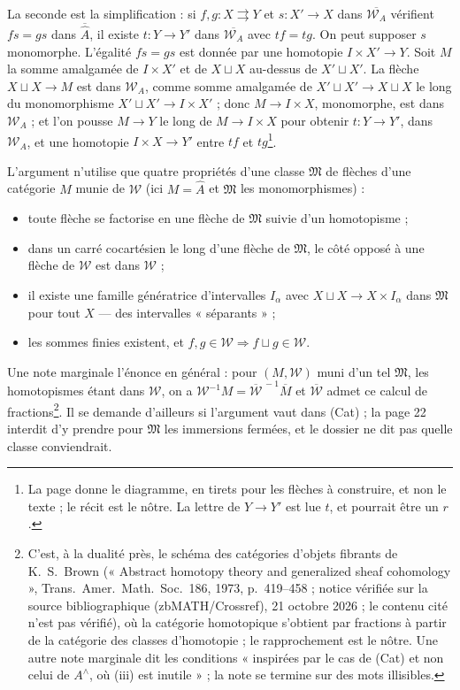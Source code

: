 \documentclass[11pt,a4paper]{article}
\begin{document}
La seconde est la simplification : si $f, g : X \rightrightarrows Y$ et
$s : X' \to X$ dans $\overline{\mathcal{W}_{A}}$ vérifient $fs = gs$ dans
$\overline{\widehat{A}}$, il existe $t : Y \to Y'$ dans
$\overline{\mathcal{W}_{A}}$ avec $tf = tg$. On peut supposer $s$ monomorphe.
L'égalité $fs = gs$ est donnée par une homotopie $I \times X' \to Y$. Soit
$M$ la somme amalgamée de $I \times X'$ et de $X \sqcup X$ au-dessus de
$X' \sqcup X'$. La flèche $X \sqcup X \to M$ est dans $\mathcal{W}_{A}$, comme
somme amalgamée de $X' \sqcup X' \to X \sqcup X$ le long du monomorphisme
$X' \sqcup X' \to I \times X'$ ; donc $M \to I \times X$, monomorphe, est dans
$\mathcal{W}_{A}$ ; et l'on pousse $M \to Y$ le long de $M \to I \times X$ pour
obtenir $t : Y \to Y'$, dans $\mathcal{W}_{A}$, et une homotopie
$I \times X \to Y'$ entre $tf$ et $tg$\footnote{La page donne le diagramme, en
tirets pour les flèches à construire, et non le texte ; le récit est le
nôtre. La lettre de $Y \to Y'$ est lue $t$, et pourrait être un $r$.}.

L'argument n'utilise que quatre propriétés d'une classe $\mathfrak{M}$ de
flèches d'une catégorie $M$ munie de $\mathcal{W}$ (ici
$M = \widehat{A}$ et $\mathfrak{M}$ les monomorphismes) :
\begin{itemize}
\item[(i)] toute flèche se factorise en une flèche de $\mathfrak{M}$ suivie
d'un homotopisme ;
\item[(ii)] dans un carré cocartésien le long d'une flèche de $\mathfrak{M}$,
le côté opposé à une flèche de $\mathcal{W}$ est dans $\mathcal{W}$ ;
\item[(iii)] il existe une famille génératrice d'intervalles $I_{\alpha}$ avec
$X \sqcup X \to X \times I_{\alpha}$ dans $\mathfrak{M}$ pour tout $X$ --- des
intervalles « séparants » ;
\item[(iv)] les sommes finies existent, et $f, g \in \mathcal{W} \Rightarrow
f \sqcup g \in \mathcal{W}$.
\end{itemize}
Une note marginale l'énonce en général : pour $(M, \mathcal{W})$ muni d'un tel
$\mathfrak{M}$, les homotopismes étant dans $\mathcal{W}$, on a
$\mathcal{W}^{-1}M = \overline{\mathcal{W}}^{\,-1}\overline{M}$ et
$\overline{\mathcal{W}}$ admet ce calcul de fractions\footnote{C'est, à la
dualité près, le schéma des catégories d'objets fibrants de K.~S.~Brown (« Abstract homotopy theory and generalized sheaf cohomology », Trans.\ Amer.\ Math.\ Soc.\ 186, 1973, p.~419--458 ; notice vérifiée sur la source bibliographique (zbMATH/Crossref), 21 octobre 2026 ; le contenu cité n'est pas vérifié),
où la catégorie homotopique s'obtient par fractions à partir de la catégorie
des classes d'homotopie ; le rapprochement est le nôtre. Une autre note
marginale dit les conditions « inspirées par le cas de (Cat) et non celui de
$A^{\wedge}$, où (iii) est inutile » ; la note se termine sur des mots
illisibles.}. Il se demande d'ailleurs si l'argument vaut dans (Cat) ; la
page 22 interdit d'y prendre pour $\mathfrak{M}$ les immersions fermées, et le
dossier ne dit pas quelle classe conviendrait.
\end{document}
